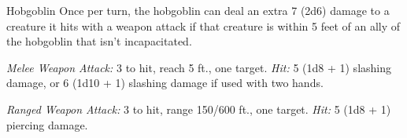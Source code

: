 \documentclass[10pt,a4paper,twoside,bg=print,twocolumn,openany,nodeprecatedcode]{dndbook}
\begin{document}
\begin{DndMonster}[float=t]{Hobgoblin}
\DndMonsterBasics[
armor-class = {18 (\textit{chain mail})},
hit-points = {\DndDice{2d8 + 2}},
speed = {30 ft.}
]
\DndMonsterAbilityScores[
 str = 13,
 dex = 12,
 con = 12,
 int = 10,
 wis = 10,
 cha = 9
]
\DndMonsterDetails[
senses = {darkvision 60 ft., passive perception 10},
languages = {Common, Goblin},
challenge = 1/2,
]
Once per turn, the hobgoblin can deal an extra 7 (2d6) damage to a creature it hits with a weapon attack if that creature is within 5 feet of an ally of the hobgoblin that isn't incapacitated.

\textsl{Melee Weapon Attack:} 3 to hit, reach 5 ft., one target. \textsl{Hit:} 5 (1d8 + 1) slashing damage, or 6 (1d10 + 1) slashing damage if used with two hands.

\textsl{Ranged Weapon Attack:} 3 to hit, range 150/600 ft., one target. \textsl{Hit:} 5 (1d8 + 1) piercing damage.

\end{DndMonster}
\end{document}
